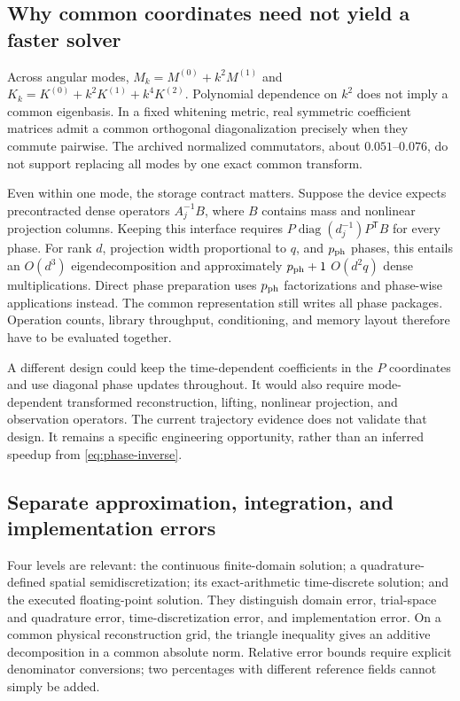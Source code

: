 \subsection{Why common coordinates need not yield a faster solver}

Across angular modes, \(M_k=M^{(0)}+k^2M^{(1)}\) and
\(K_k=K^{(0)}+k^2K^{(1)}+k^4K^{(2)}\). Polynomial dependence on
\(k^2\) does not imply a common eigenbasis. In a fixed whitening
metric, real symmetric coefficient matrices admit a common
orthogonal diagonalization precisely when they commute pairwise.
The archived normalized commutators, about \(0.051\)--\(0.076\),
do not support replacing all modes by one exact common transform.

Even within one mode, the storage contract matters. Suppose the
device expects precontracted dense operators \(A_j^{-1}B\), where
\(B\) contains mass and nonlinear projection columns. Keeping this
interface requires
\(P\operatorname{diag}(d_j^{-1})P^{\mathsf T}B\) for every phase.
For rank \(d\), projection width proportional to \(q\), and
\(p_{\rm ph}\) phases, this entails an \(O(d^3)\)
eigendecomposition and approximately \(p_{\rm ph}+1\)
\(O(d^2q)\) dense multiplications. Direct phase preparation uses
\(p_{\rm ph}\) factorizations and phase-wise applications instead.
The common representation still writes all phase packages. Operation
counts, library throughput, conditioning, and memory layout therefore
have to be evaluated together.

A different design could keep the time-dependent coefficients in
the \(P\) coordinates and use diagonal phase updates throughout.
It would also require mode-dependent transformed reconstruction,
lifting, nonlinear projection, and observation operators. The current
trajectory evidence does not validate that design. It remains a
specific engineering opportunity, rather than an inferred speedup
from \eqref{eq:phase-inverse}.

\subsection{Separate approximation, integration, and implementation errors}

Four levels are relevant: the continuous finite-domain solution; a
quadrature-defined spatial semidiscretization; its exact-arithmetic
time-discrete solution; and the executed floating-point solution.
They distinguish domain error, trial-space and quadrature error,
time-discretization error, and implementation error. On a common
physical reconstruction grid, the triangle inequality gives an
additive decomposition in a common absolute norm. Relative error
bounds require explicit denominator conversions; two percentages
with different reference fields cannot simply be added.

